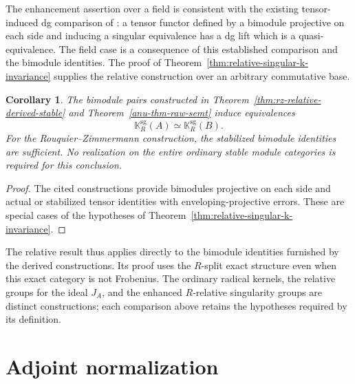 \documentclass[12pt,a4paper,english,reqno]{amsart}
\numberwithin{equation}{section}
\theoremstyle{plain}
\newtheorem{corollary}[theorem]{Corollary}
\theoremstyle{definition}
\begin{document}
The enhancement assertion over a field is consistent with the
existing tensor-induced dg comparison of
\cite[Proposition~3.1 and Lemma~3.2]{ChenLiuWang2023}: a tensor
functor defined by a bimodule projective on each side and inducing
a singular equivalence has a dg lift which is a quasi-equivalence. The field case is a consequence of this
established comparison and the bimodule identities. The proof of
Theorem~\ref{thm:relative-singular-k-invariance} supplies the relative
construction over an arbitrary commutative base.

\begin{corollary}\label{cor:derived-source-relative-k}
The bimodule pairs constructed in
Theorem~\ref{thm:rz-relative-derived-stable} and
Theorem~\ref{anu-thm-raw-semt} induce equivalences
\[
                  \mathbb K_R^{\mathrm{sg}}(A)
                    \simeq\mathbb K_R^{\mathrm{sg}}(B).
\]
For the Rouquier--Zimmermann construction, the stabilized
bimodule identities are sufficient. No realization on the entire
ordinary stable module categories is required for this conclusion.
\end{corollary}

\begin{proof}
The cited constructions provide bimodules projective on each side
and actual or stabilized tensor identities with enveloping-projective
errors. These are special cases of the hypotheses of
Theorem~\ref{thm:relative-singular-k-invariance}.
\end{proof}

The relative result thus applies directly to the bimodule
identities furnished by the derived constructions. Its proof uses
the $R$-split exact structure even when this exact category
is not Frobenius. The ordinary radical kernels, the
relative groups for the ideal $J_A$, and the enhanced $R$-relative
singularity groups are distinct constructions; each comparison
above retains the hypotheses required by its definition.

\section{Adjoint normalization}
\label{sec:adjoint-normalization}
\end{document}

